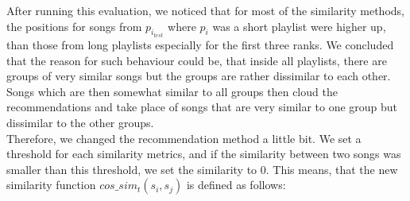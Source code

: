 After running this evaluation, we noticed that for most of the similarity methods, the positions for songs from $p_{i_{test}} $ where $p_i$ was a short playlist were higher up, than those from long playlists especially for the first three ranks. We concluded that the reason for such behaviour could be, that inside all playlists, there are groups of very similar songs but the groups are rather dissimilar to each other. Songs which are then somewhat similar to all groups then cloud the recommendations and take place of songs that are very similar to one group but dissimilar to the other groups.\\
Therefore, we changed the recommendation method a little bit. We set a threshold for each similarity metrics, and if the similarity between two songs was smaller than this threshold, we set the similarity to 0. This means, that the new similarity function $cos\_sim_t(s_i,s_j)$ is defined as follows:

